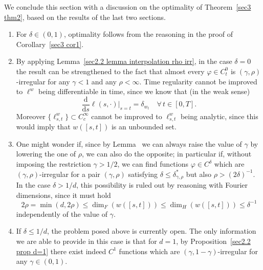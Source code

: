 \documentclass[10pt]{article}
\newcommand{\mathd}{\mathrm{d}}
\newcommand{\nobracket}{}
\newcommand{\tmcolor}[2]{{\color{#1}{#2}}}
\newenvironment{enumeratenumeric}{\begin{enumerate}[1.] }{\end{enumerate}}
\begin{document}
\begin{remark}
  \label{sec5.2 discussion optimality}We conclude this section with a
  discussion on the optimality of Theorem~\ref{sec3 thm2}, based on the
  results of the last two sections.
  \begin{enumeratenumeric}
    \item For $\delta \in (0, 1)$, optimality follows from the reasoning in
    the proof of Corollary~\ref{sec3 cor1}.
    
    \item By applying Lemma~\ref{sec2.2 lemma interpolation rho irr}, in the
    case $\delta = 0$ the result can be strengthened to the fact that almost
    every $\varphi \in C^0_t$ is $(\gamma, \rho)$\mbox{-}irregular for any
    $\gamma < 1$ and any $\rho < \infty$. Time regularity cannot be improved
    to $\ell^w$ being differentiable in time, since we know that (in the weak
    sense)
    \[ \frac{\mathd}{\mathd s} \ell (s, \cdot) |_{s = t} \nobracket =
       \delta_{w_t} \quad \forall \, t \in [0, T] . \]
    Moreover $\{ \ell_{s, t}^w \} \subset C^{\infty}_c$ cannot be improved to
    $\ell^w_{s, t}$ being analytic, since this would imply that $w ([s, t])$
    is an unbounded set.
    
    \item One might wonder if, since by Lemma~\tmcolor{blue}{\ref{sec2.2 lemma
    interpolation rho irr}} we can always raise the value of $\gamma$ by
    lowering the one of $\rho$, we can also do the opposite; in particular if,
    without imposing the restriction $\gamma > 1 / 2$, we can find functions
    $\varphi \in C^{\delta}$ which are $(\gamma, \rho)$-irregular for a pair
    $(\gamma, \rho)$ satisfying $\delta \leqslant \delta^{\ast}_{\gamma,
    \rho}$ but also $\rho > (2 \delta)^{- 1}$. In the case $\delta > 1 / d$,
    this possibility is ruled out by reasoning with Fourier dimensions, since
    it must hold
    \[ 2 \rho = \min (d, 2 \rho) \leqslant \dim_F (w ([s, t])) \leqslant
       \dim_H (w ([s, t])) \leqslant \delta^{- 1} \]
    independently of the value of $\gamma$.
    
    \item If $\delta \leqslant 1 / d$, the problem posed above is currently
    open. The only information we are able to provide in this case is that for
    $d = 1$, by Proposition~\ref{sec2.2 prop d=1} there exist indeed $C^1$
    functions which are $(\gamma, 1 - \gamma)$\mbox{-}irregular for any
    $\gamma \in (0, 1)$.
  \end{enumeratenumeric}
\end{remark}
\end{document}
